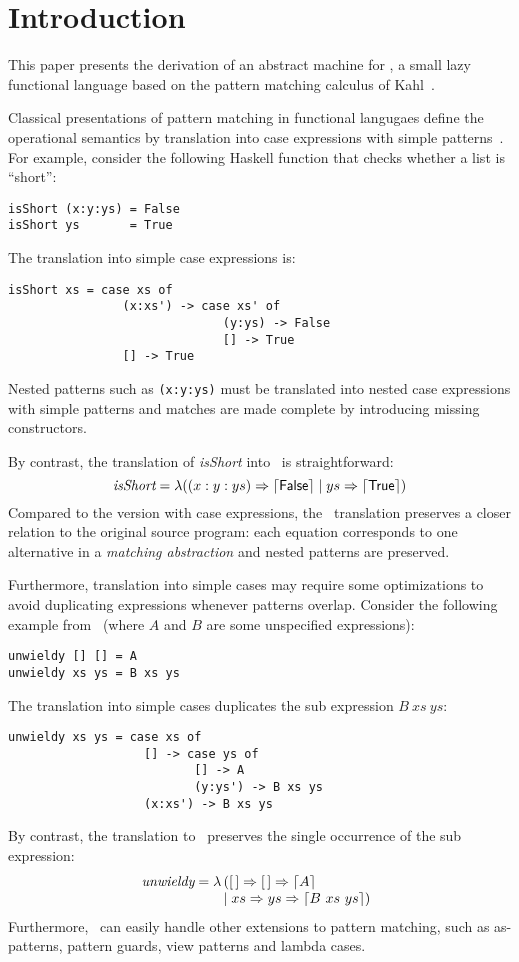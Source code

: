 \section{Introduction}

This paper presents the derivation of an abstract machine for \lambdaPMC, a small
lazy functional language based on the pattern matching calculus
of Kahl~\cite{kahl_2004}.

Classical presentations of pattern matching in functional langugaes
define the operational semantics by translation
into case expressions with simple patterns~\cite{spj_1987,jones_1992}. For
example, consider the following Haskell function that checks whether a
list is ``short'':
\begin{verbatim}
isShort (x:y:ys) = False
isShort ys       = True
\end{verbatim}
The translation into simple case expressions is:
\begin{verbatim}
isShort xs = case xs of
                (x:xs') -> case xs' of
                              (y:ys) -> False
                              [] -> True
                [] -> True
\end{verbatim}
Nested patterns such as \verb|(x:y:ys)| must be translated into nested
case expressions with simple patterns and matches are made complete by
introducing missing constructors.  

By contrast, the translation of \textit{isShort} into \lambdaPMC\ is
straightforward:
\[ 
  \textit{isShort} = \lambda ((x:y:ys) \Rightarrow \left\lceil \textsf{False}\right\rceil \mid
  ys \Rightarrow \left\lceil \textsf{True}\right\rceil) 
\]
Compared to the version with case expressions, the \lambdaPMC\ translation
preserves a closer relation to the original source program: each
equation corresponds to one alternative in a \emph{matching
  abstraction} and nested patterns are preserved. 

Furthermore, translation into simple cases may require some
optimizations to avoid duplicating expressions whenever patterns
overlap. Consider the following example from~\cite{spj_1987} (where
$A$ and $B$ are some unspecified expressions):
\begin{verbatim}
unwieldy [] [] = A
unwieldy xs ys = B xs ys
\end{verbatim}
The translation into simple cases duplicates the sub expression $B~ xs~ ys$:
\begin{verbatim}
unwieldy xs ys = case xs of
                   [] -> case ys of
                          [] -> A
                          (y:ys') -> B xs ys
                   (x:xs') -> B xs ys
\end{verbatim}
By contrast, the translation to \lambdaPMC\ preserves the single occurrence of
the sub expression:
\[
  \textit{unwieldy} =
  \lambda\!\! \begin{array}[t]{l}
             ([\,] \Rightarrow [\,] \Rightarrow \left\lceil A\right\rceil \\
             \mid xs \Rightarrow ys \Rightarrow \left\lceil B~xs~ys\right\rceil)
             \end{array}
\]
Furthermore, \lambdaPMC\ can easily handle
other extensions to pattern matching, such as as-patterns, 
pattern guards, view patterns and lambda cases.

